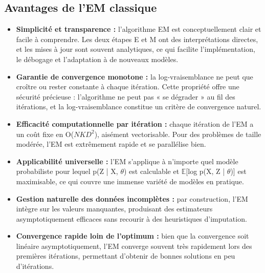 \subsection{Avantages de l'EM classique}
\begin{itemize}
\item \textbf{Simplicité et transparence : }l'algorithme EM est conceptuellement clair et facile à comprendre. Les deux étapes E et M ont des interprétations directes, et les mises à jour sont souvent analytiques, ce qui facilite l'implémentation, le débogage et l'adaptation à de nouveaux modèles.
\item \textbf{Garantie de convergence monotone : }la log-vraisemblance ne peut que croître ou rester constante à chaque itération. Cette propriété offre une sécurité précieuse : l'algorithme ne peut pas « se dégrader » au fil des itérations, et la log-vraisemblance constitue un critère de convergence naturel.
\item \textbf{Efficacité computationnelle par itération : }chaque itération de l'EM a un coût fixe en O($NKD^{2}$), aisément vectorisable. Pour des problèmes de taille modérée, l'EM est extrêmement rapide et se parallélise bien.
\item \textbf{Applicabilité universelle : }l'EM s'applique à n'importe quel modèle probabiliste pour lequel p(Z | X, $\theta $) est calculable et $\mathbb{E}$[log p(X, Z | $\theta $)] est maximisable, ce qui couvre une immense variété de modèles en pratique.
\item \textbf{Gestion naturelle des données incomplètes : }par construction, l'EM intègre sur les valeurs manquantes, produisant des estimateurs asymptotiquement efficaces sans recourir à des heuristiques d'imputation.
\item \textbf{Convergence rapide loin de l'optimum : }bien que la convergence soit linéaire asymptotiquement, l'EM converge souvent très rapidement lors des premières itérations, permettant d'obtenir de bonnes solutions en peu d'itérations.
\end{itemize}
